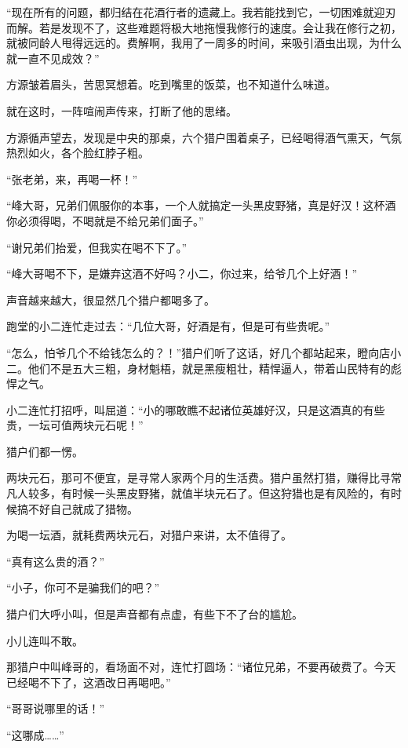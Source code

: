 
\begin{this_body}

“现在所有的问题，都归结在花酒行者的遗藏上。我若能找到它，一切困难就迎刃而解。若是发现不了，这些难题将极大地拖慢我修行的速度。会让我在修行之初，就被同龄人甩得远远的。费解啊，我用了一周多的时间，来吸引酒虫出现，为什么就一直不见成效？”

方源皱着眉头，苦思冥想着。吃到嘴里的饭菜，也不知道什么味道。

就在这时，一阵喧闹声传来，打断了他的思绪。

方源循声望去，发现是中央的那桌，六个猎户围着桌子，已经喝得酒气熏天，气氛热烈如火，各个脸红脖子粗。

“张老弟，来，再喝一杯！”

“峰大哥，兄弟们佩服你的本事，一个人就搞定一头黑皮野猪，真是好汉！这杯酒你必须得喝，不喝就是不给兄弟们面子。”

“谢兄弟们抬爱，但我实在喝不下了。”

“峰大哥喝不下，是嫌弃这酒不好吗？小二，你过来，给爷几个上好酒！”

声音越来越大，很显然几个猎户都喝多了。

跑堂的小二连忙走过去：“几位大哥，好酒是有，但是可有些贵呢。”

“怎么，怕爷几个不给钱怎么的？！”猎户们听了这话，好几个都站起来，瞪向店小二。他们不是五大三粗，身材魁梧，就是黑瘦粗壮，精悍逼人，带着山民特有的彪悍之气。

小二连忙打招呼，叫屈道：“小的哪敢瞧不起诸位英雄好汉，只是这酒真的有些贵，一坛可值两块元石呢！”

猎户们都一愣。

两块元石，那可不便宜，是寻常人家两个月的生活费。猎户虽然打猎，赚得比寻常凡人较多，有时候一头黑皮野猪，就值半块元石了。但这狩猎也是有风险的，有时候搞不好自己就成了猎物。

为喝一坛酒，就耗费两块元石，对猎户来讲，太不值得了。

“真有这么贵的酒？”

“小子，你可不是骗我们的吧？”

猎户们大呼小叫，但是声音都有点虚，有些下不了台的尴尬。

小儿连叫不敢。

那猎户中叫峰哥的，看场面不对，连忙打圆场：“诸位兄弟，不要再破费了。今天已经喝不下了，这酒改日再喝吧。”

“哥哥说哪里的话！”

“这哪成……”


\end{this_body}

